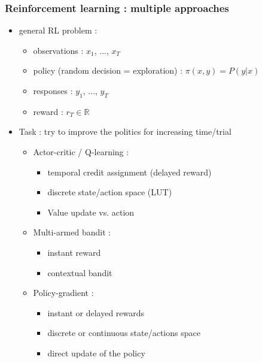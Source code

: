\documentclass{beamer}
\begin{document}
\begin{frame} \frametitle{Reinforcement learning : multiple approaches}
	\vspace{-.6cm}
  \begin{itemize}
    \item general RL problem :
    \vspace{-.1cm}
    \begin{itemize}
      \item observations : $x_1$, ..., $x_T$
      \item policy (random decision = exploration) : $\pi(x,y) = P(y|x)$
      \item responses : $y_1$, ..., $y_T$
      \item reward : $r_T \in \mathbb{R}$ 	
    \end{itemize}
    \item Task : try to improve the politics for increasing time/trial
        \vspace{-.1cm}
    \begin{itemize}
      \item Actor-critic / Q-learning :
          \vspace{-.1cm} 
      \begin{itemize}
       \item temporal credit assignment (delayed reward)
       \item discrete state/action space (LUT)
       \item Value update vs. action 
      \end{itemize}
      \item Multi-armed bandit : 
          \vspace{-.1cm}
      \begin{itemize}
        \item instant reward
        \item contextual bandit
      \end{itemize}  
      \item Policy-gradient : 
          \vspace{-.1cm}
      \begin{itemize}
        \item instant or delayed rewards
        \item discrete or continuous state/actions space
        \item direct update of the policy
      \end{itemize}  
    \end{itemize}
  \end{itemize}
\end{frame}
\end{document}
